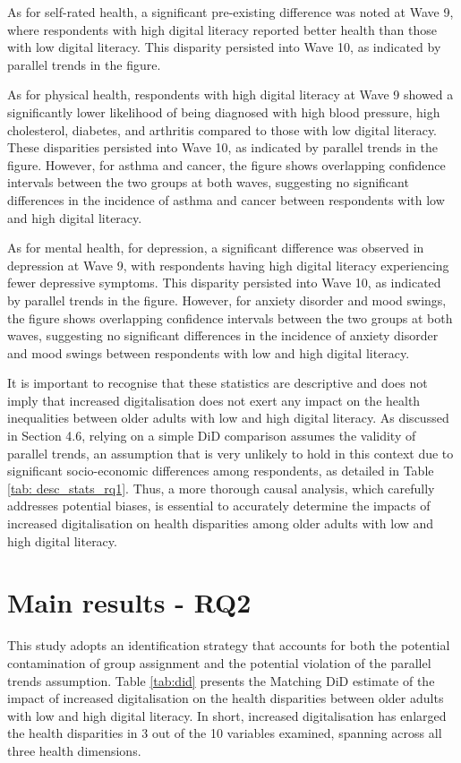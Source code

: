 As for self-rated health, a significant pre-existing difference was noted at Wave 9, where respondents with high digital literacy reported better health than those with low digital literacy. This disparity persisted into Wave 10, as indicated by parallel trends in the figure.

As for physical health, respondents with high digital literacy at Wave 9 showed a significantly lower likelihood of being diagnosed with high blood pressure, high cholesterol, diabetes, and arthritis compared to those with low digital literacy. These disparities persisted into Wave 10, as indicated by parallel trends in the figure. However, for asthma and cancer, the figure shows overlapping confidence intervals between the two groups at both waves, suggesting no significant differences in the incidence of asthma and cancer between respondents with low and high digital literacy.

As for mental health, for depression, a significant difference was observed in depression at Wave 9, with respondents having high digital literacy experiencing fewer depressive symptoms. This disparity persisted into Wave 10, as indicated by parallel trends in the figure. However, for anxiety disorder and mood swings, the figure shows overlapping confidence intervals between the two groups at both waves, suggesting no significant differences in the incidence of anxiety disorder and mood swings between respondents with low and high digital literacy.

It is important to recognise that these statistics are descriptive and does not imply that increased digitalisation does not exert any impact on the health inequalities between older adults with low and high digital literacy. As discussed in Section 4.6, relying on a simple DiD comparison assumes the validity of parallel trends, an assumption that is very unlikely to hold in this context due to significant socio-economic differences among respondents, as detailed in Table \ref{tab: desc_stats_rq1}. Thus, a more thorough causal analysis, which carefully addresses potential biases, is essential to accurately determine the impacts of increased digitalisation on health disparities among older adults with low and high digital literacy.

\section{Main results - RQ2}
This study adopts an identification strategy that accounts for both the potential contamination of group assignment and the potential violation of the parallel trends assumption. Table \ref{tab:did} presents the Matching DiD estimate of the impact of increased digitalisation on the health disparities between older adults with low and high digital literacy. In short, increased digitalisation has enlarged the health disparities in 3 out of the 10 variables examined, spanning across all three health dimensions. 

